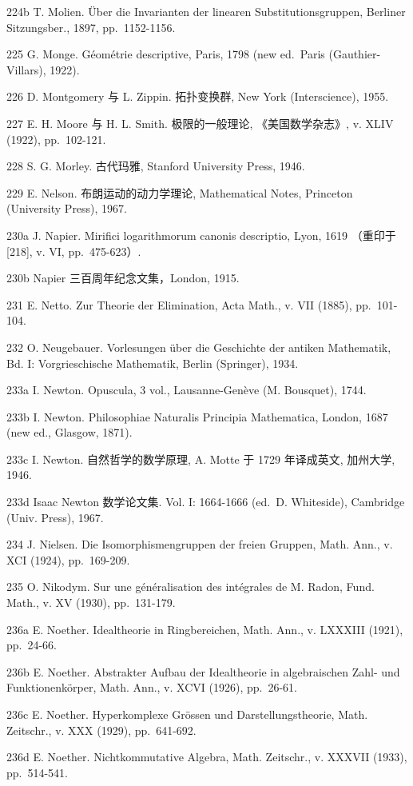 224b T. Molien. Über die Invarianten der linearen Substitutionsgruppen, Berliner Sitzungsber., 1897, pp.~1152-1156.

225 G. Monge. Géométrie descriptive, Paris, 1798 (new ed.~Paris (Gauthier-Villars), 1922).

226 D. Montgomery 与 L. Zippin. 拓扑变换群, New York (Interscience), 1955.

227 E. H. Moore 与 H. L. Smith. 极限的一般理论, 《美国数学杂志》, v. XLIV (1922), pp.~102-121.

228 S. G. Morley. 古代玛雅, Stanford University Press, 1946.

229 E. Nelson. 布朗运动的动力学理论, Mathematical Notes, Princeton (University Press), 1967.

230a J. Napier. Mirifici logarithmorum canonis descriptio, Lyon, 1619 （重印于 {[}218{]}, v. VI, pp.~475-623）.

230b Napier 三百周年纪念文集，London, 1915.

231 E. Netto. Zur Theorie der Elimination, Acta Math., v. VII (1885), pp.~101-104.

232 O. Neugebauer. Vorlesungen über die Geschichte der antiken Mathematik, Bd. I: Vorgrieschische Mathematik, Berlin (Springer), 1934.

233a I. Newton. Opuscula, 3 vol., Lausanne-Genève (M. Bousquet), 1744.

233b I. Newton. Philosophiae Naturalis Principia Mathematica, London, 1687 (new ed., Glasgow, 1871).

233c I. Newton. 自然哲学的数学原理, A. Motte 于 1729 年译成英文, 加州大学, 1946.

233d Isaac Newton 数学论文集. Vol. I: 1664-1666 (ed.~D. Whiteside), Cambridge (Univ. Press), 1967.

234 J. Nielsen. Die Isomorphismengruppen der freien Gruppen, Math. Ann., v. XCI (1924), pp.~169-209.

235 O. Nikodym. Sur une généralisation des intégrales de M. Radon, Fund. Math., v. XV (1930), pp.~131-179.

236a E. Noether. Idealtheorie in Ringbereichen, Math. Ann., v. LXXXIII (1921), pp.~24-66.

236b E. Noether. Abstrakter Aufbau der Idealtheorie in algebraischen Zahl- und Funktionenkörper, Math. Ann., v. XCVI (1926), pp.~26-61.

236c E. Noether. Hyperkomplexe Grössen und Darstellungstheorie, Math. Zeitschr., v. XXX (1929), pp.~641-692.

236d E. Noether. Nichtkommutative Algebra, Math. Zeitschr., v. XXXVII (1933), pp.~514-541.

